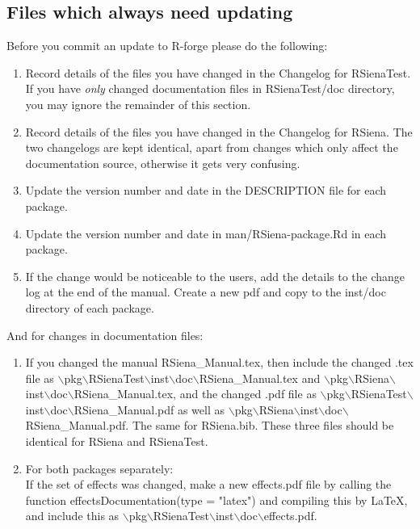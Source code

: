\documentclass[12pt, a4paper]{article}
\renewcommand{\=}{\,=\,}
\newcommand{\+}{\,+\,}
\newcommand{\bs}{\backslash}
\begin{document}
\subsection{Files which always need updating}
 Before you commit an update to R-forge please do the following:
\begin{enumerate}
\item Record details of the files you have changed in the Changelog for
  RSienaTest. If you have \emph{only} changed documentation files in
  \textsf{RSienaTest/doc} directory, you may ignore the remainder of this
  section.
\item Record details of the files you have changed in the Changelog for RSiena.
  The two changelogs are kept identical, apart from changes which only affect
  the documentation source, otherwise it gets very confusing.
\item Update the version number and date in the \textsf{DESCRIPTION} file for
  each package.
\item Update the version number and date in \textsf{man/RSiena-package.Rd} in
  each package.
\item If the change would be noticeable to the users, add the details to the
  change log at the end of the manual. Create a new pdf and copy to the inst/doc
  directory of each package.
\end{enumerate}

And for changes in documentation files:
\begin{enumerate}
\item If you changed the manual \textsf{RSiena\_Manual.tex}, then include the
  changed .tex file as \textsf{$\bs$pkg$\bs$RSienaTest$\bs$inst$\bs$doc$\bs$RSiena\_Manual.tex} and
  \textsf{$\bs$pkg$\bs$RSiena$\bs$inst$\bs$doc$\bs$RSiena\_Manual.tex},
  and the changed .pdf file as
  \textsf{$\bs$pkg$\bs$RSienaTest$\bs$inst$\bs$doc$\bs$RSiena\_Manual.pdf} as well as
  \textsf{$\bs$pkg$\bs$RSiena$\bs$inst$\bs$doc$\bs$RSiena\_Manual.pdf}. The same for \textsf{RSiena.bib}.
  These three files should be identical for \textsf{RSiena} and \textsf{RSienaTest}.
\item For both packages separately:\\
  If the set of effects was changed, make a new \textsf{effects.pdf} file by
  calling the function \textsf{effectsDocumentation(type = "latex")} and compiling
  this by \LaTeX, and include this as \textsf{$\bs$pkg$\bs$RSienaTest$\bs$inst$\bs$doc$\bs$effects.pdf}.
\end{enumerate}
\end{document}
